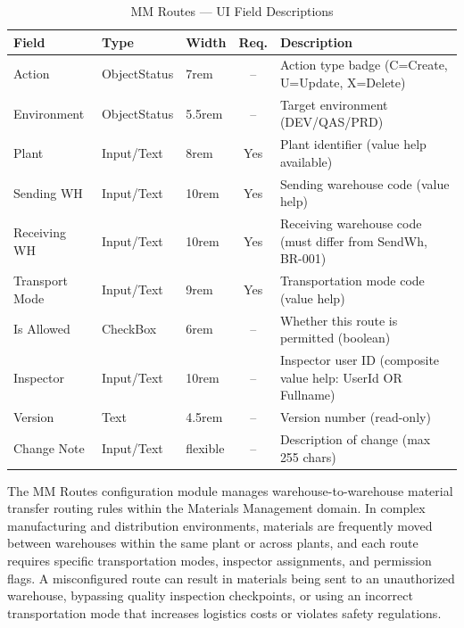 \documentclass[12pt,a4paper]{report}
\begin{document}
\begin{table}[H]
\centering\small
\begin{tabularx}{\textwidth}{|l|l|l|c|X|}
  \hline
  \rowcolor{tableheadpeach}
  \textbf{Field} & \textbf{Type} & \textbf{Width} & \textbf{Req.} & \textbf{Description} \\ \hline
  Action & ObjectStatus & 7rem & -- & Action type badge (C=Create, U=Update, X=Delete) \\ \hline
  Environment & ObjectStatus & 5.5rem & -- & Target environment (DEV/QAS/PRD) \\ \hline
  Plant & Input/Text & 8rem & Yes & Plant identifier (value help available) \\ \hline
  Sending WH & Input/Text & 10rem & Yes & Sending warehouse code (value help) \\ \hline
  Receiving WH & Input/Text & 10rem & Yes & Receiving warehouse code (must differ from SendWh, BR-001) \\ \hline
  Transport Mode & Input/Text & 9rem & Yes & Transportation mode code (value help) \\ \hline
  Is Allowed & CheckBox & 6rem & -- & Whether this route is permitted (boolean) \\ \hline
  Inspector & Input/Text & 10rem & -- & Inspector user ID (composite value help: UserId OR Fullname) \\ \hline
  Version & Text & 4.5rem & -- & Version number (read-only) \\ \hline
  Change Note & Input/Text & flexible & -- & Description of change (max 255 chars) \\ \hline
\end{tabularx}
\caption{MM Routes --- UI Field Descriptions}
\label{tab:ui-mm-fields}
\end{table}

The MM Routes configuration module manages warehouse-to-warehouse material transfer routing rules within the Materials Management domain. In complex manufacturing and distribution environments, materials are frequently moved between warehouses within the same plant or across plants, and each route requires specific transportation modes, inspector assignments, and permission flags. A misconfigured route can result in materials being sent to an unauthorized warehouse, bypassing quality inspection checkpoints, or using an incorrect transportation mode that increases logistics costs or violates safety regulations.
\end{document}
